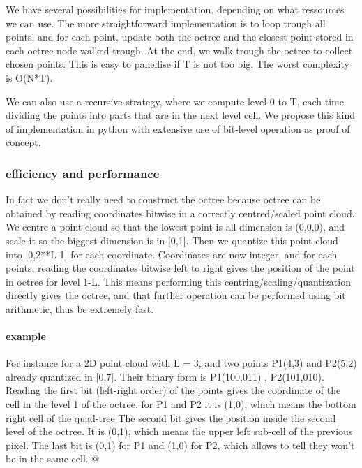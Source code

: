 			We have several possibilities for implementation, depending on what ressources we can use.
			The more straightforward implementation is to loop trough all points, and for each point, update both the octree and the closest point stored in each octree node walked trough. At the end, we walk trough the octree to collect chosen points. This is easy to panellise if T is not too big.
			The worst complexity is O(N*T).
			
			We can also use a recursive strategy, where we compute level 0 to T, each time dividing the points into parts that are in the next level cell.
			We propose this kind of implementation in python with extensive use of bit-level operation as proof of concept.
			
		\subsubsection{efficiency and performance}
			In fact we don't really need to construct the octree because octree can be obtained by reading coordinates bitwise in a correctly centred/scaled point cloud.
			We centre a point cloud so that the lowest point is all dimension is (0,0,0), and scale it so the biggest dimension is in [0,1].
			Then we quantize this point cloud into [0,2**L-1] for each coordinate.
			Coordinates are now integer, and for each points, reading the coordinates bitwise left to right gives the position of the point in octree for level 1-L.
			This means performing this centring/scaling/quantization directly gives the octree, and that further operation can be performed using bit arithmetic, thus be extremely fast.
			
			\paragraph{example} 
				For instance for a 2D point cloud with L = 3, and two points P1(4,3) and P2(5,2) already quantized in [0,7].
				Their binary form is P1(100,011) , P2(101,010).
				Reading the first bit (left-right order) of the points gives the coordinate of the cell in the level 1 of the octree.
				for P1 and P2 it is (1,0), which means the bottom right cell of the quad-tree
				The second bit gives the position inside the second level of the octree.
				It is (0,1), which means the upper left sub-cell of the previous pixel.
				The last bit is (0,1) for P1 and (1,0) for P2, which allows to tell they won't be in the same cell.
				@
				 
